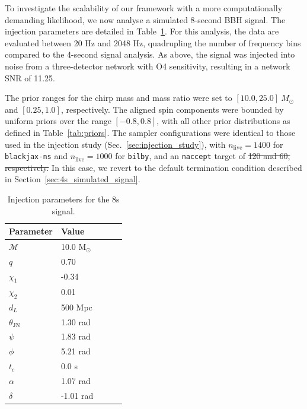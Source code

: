 \documentclass[fleqn,usenatbib]{mnras}
\providecommand{\DIFadd}[1]{{\protect\color{blue}\uwave{#1}}} %
\providecommand{\DIFdel}[1]{{\protect\color{red}\sout{#1}}}                      %
\providecommand{\DIFaddbegin}{} %
\providecommand{\DIFaddend}{} %
\providecommand{\DIFdelbegin}{} %
\providecommand{\DIFdelend}{} %
\newcommand{\DIFscaledelfig}{0.5}
\newlength{\DIFdelgraphicswidth} %
\newlength{\DIFdelgraphicsheight} %
\newcommand{\DIFaddincludegraphics}[2][]{{\color{blue}\fbox{\DIFOincludegraphics[#1]{#2}}}} %
\newcommand{\DIFdelincludegraphics}[2][]{%
\sbox{\DIFdelgraphicsbox}{\DIFOincludegraphics[#1]{#2}}%
\settoboxwidth{\DIFdelgraphicswidth}{\DIFdelgraphicsbox} %
\settoboxtotalheight{\DIFdelgraphicsheight}{\DIFdelgraphicsbox} %
\scalebox{\DIFscaledelfig}{%
\parbox[b]{\DIFdelgraphicswidth}{\usebox{\DIFdelgraphicsbox}\\[-\baselineskip] \rule{\DIFdelgraphicswidth}{0em}}\llap{\resizebox{\DIFdelgraphicswidth}{\DIFdelgraphicsheight}{%
\setlength{\unitlength}{\DIFdelgraphicswidth}%
\begin{picture}(1,1)%
\thicklines\linethickness{2pt} %
{\color[rgb]{1,0,0}\put(0,0){\framebox(1,1){}}}%
{\color[rgb]{1,0,0}\put(0,0){\line( 1,1){1}}}%
{\color[rgb]{1,0,0}\put(0,1){\line(1,-1){1}}}%
\end{picture}%
}\hspace*{3pt}}} %
} %
\DeclareRobustCommand{\DIFaddbegin}{\DIFOaddbegin \let\includegraphics\DIFaddincludegraphics} %
\DeclareRobustCommand{\DIFaddend}{\DIFOaddend \let\includegraphics\DIFOincludegraphics} %
\DeclareRobustCommand{\DIFdelbegin}{\DIFOdelbegin \let\includegraphics\DIFdelincludegraphics} %
\DeclareRobustCommand{\DIFdelend}{\DIFOaddend \let\includegraphics\DIFOincludegraphics} %
\begin{document}
To investigate the scalability of our framework with a more
computationally demanding likelihood, we now analyse a simulated
8-second BBH signal. The injection parameters are detailed in
Table~\ref{tab:8s_injection_params}. For this analysis, the data are
evaluated between 20 Hz and 2048 Hz, quadrupling the number of
frequency bins compared to the 4-second signal analysis. As above, the signal was
injected into noise from a three-detector network with O4 sensitivity,
resulting in a network SNR of 11.25.

The prior ranges for the chirp mass and mass ratio were set to
$[10.0, 25.0]~M_{\odot}$ and $[0.25, 1.0]$, respectively. The aligned
spin components were bounded by uniform priors over the range
$[-0.8, 0.8]$, with all other prior distributions as defined in
Table~\ref{tab:priors}. The sampler configurations were identical to
those used in the injection study (Sec.~\ref{sec:injection_study}), with
$n_{\text{live}}=1400$ for \texttt{blackjax-ns} and
$n_{\text{live}}=1000$ for \texttt{bilby}, and an \texttt{naccept}
target of \DIFdelbegin \DIFdel{120 and 60, respectively. }\DIFdelend \DIFaddbegin \DIFadd{60. }\DIFaddend In this case, we revert to the 
default termination condition described in Section~\ref{sec:4s_simulated_signal}.

\begin{table}
    \centering
    \caption{Injection parameters for the 8s signal.}
    \label{tab:8s_injection_params}
    \begin{tabular}{l l l c c}
    \hline
    \hline
    \textbf{Parameter} & \textbf{Value} \\
    \hline
    $\mathcal{M}$ & 10.0 M$_{\odot}$ \\
    $q$ & 0.70 \\
    $\chi_1$ & -0.34 \\
    $\chi_2$ & 0.01 \\
    $d_L$ & 500 Mpc \\
    $\theta_{\textrm{JN}}$ & 1.30 rad \\
    $\psi$ & 1.83 rad \\
    $\phi$ & 5.21 rad \\
    $t_c$ & 0.0 s\\
    $\alpha$ & 1.07 rad \\
    $\delta$ & -1.01 rad \\
    \hline
    \hline
    \end{tabular}
    \end{table}
\end{document}

